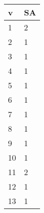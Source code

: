 \begin{tabular}{ll}
v & SA \\ 
\hline 
1 & 2 \\ 
2 & 1 \\ 
3 & 1 \\ 
4 & 1 \\ 
5 & 1 \\ 
6 & 1 \\ 
7 & 1 \\ 
8 & 1 \\ 
9 & 1 \\ 
10 & 1 \\ 
11 & 2 \\ 
12 & 1 \\ 
13 & 1 \\ 
\hline 
\end{tabular}